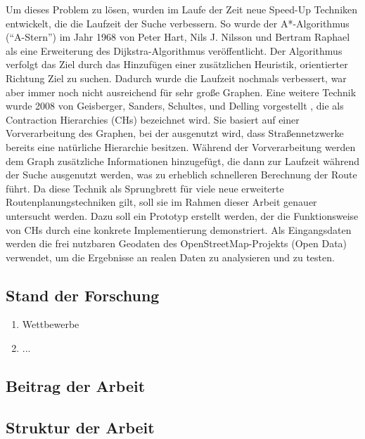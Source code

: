 Um dieses Problem zu lösen, wurden im Laufe der Zeit neue Speed-Up Techniken entwickelt, die die
Laufzeit der Suche verbessern. So wurde \ua der A*-Algorithmus ("`A-Stern"') im Jahr 1968 von Peter
Hart, Nils J. Nilsson und Bertram Raphael als eine Erweiterung des Dijkstra-Algorithmus
veröffentlicht. Der Algorithmus verfolgt das Ziel durch das Hinzufügen einer
zusätzlichen Heuristik, orientierter Richtung Ziel zu suchen. Dadurch wurde die Laufzeit
nochmals verbessert, war aber immer noch nicht ausreichend für sehr große Graphen.
Eine weitere Technik wurde 2008 von Geisberger, Sanders, Schultes, und Delling vorgestellt
\cite{geisberger.workshop}, die als Contraction Hierarchies (CHs) bezeichnet wird. Sie basiert auf
einer Vorverarbeitung des Graphen, bei der ausgenutzt wird, dass Straßennetzwerke bereits eine
natürliche Hierarchie besitzen. Während der Vorverarbeitung werden dem Graph zusätzliche
Informationen hinzugefügt, die dann zur Laufzeit während der Suche ausgenutzt werden, was zu
erheblich schnelleren Berechnung der Route führt. Da diese Technik als Sprungbrett für viele neue erweiterte
Routenplanungstechniken gilt, soll sie im Rahmen dieser Arbeit genauer untersucht werden. Dazu soll
ein Prototyp erstellt werden, der die Funktionsweise von CHs durch eine konkrete
Implementierung demonstriert. Als Eingangsdaten werden die frei nutzbaren Geodaten des
OpenStreetMap-Projekts (Open Data)  verwendet, um die Ergebnisse an realen Daten zu
analysieren und zu testen.


\subsection{Stand der Forschung}
\begin{enumerate}
    \item Wettbewerbe
    \item ...
\end{enumerate}

\subsection{Beitrag der Arbeit}

\subsection{Struktur der Arbeit}
